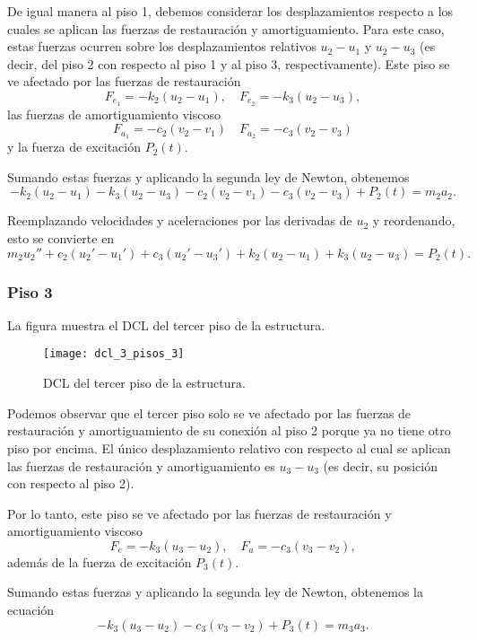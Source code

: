 De igual manera al piso 1, debemos considerar los desplazamientos respecto a los cuales se aplican las fuerzas de restauración y amortiguamiento. Para este caso, estas fuerzas ocurren sobre los desplazamientos relativos \(u_2 - u_1\) y \(u_2 - u_3\) (es decir, del piso 2 con respecto al piso 1 y al piso 3, respectivamente). Este piso se ve afectado por las fuerzas de restauración
\[
    F_{e_1} = -k_2(u_2 - u_1), \quad F_{e_2} = -k_3(u_2 - u_3)
,\]
las fuerzas de amortiguamiento viscoso
\[
    F_{a_1} = -c_2(v_2 - v_1) \quad F_{a_2} = -c_3(v_2 - v_3)
\]
y la fuerza de excitación \(P_2(t)\).

Sumando estas fuerzas y aplicando la segunda ley de Newton, obtenemos
\[
    -k_2(u_2 - u_1) - k_3(u_2 - u_3) - c_2(v_2 - v_1) - c_3(v_2 - v_3) + P_2(t) = m_2 a_2
.\]

Reemplazando velocidades y aceleraciones por las derivadas de \(u_2\) y reordenando, esto se convierte en
\begin{equation}\label{eqn:floor-2}
    m_2 u_2'' + c_2(u_2' - u_1') + c_3(u_2' - u_3') + k_2(u_2 - u_1) + k_3(u_2 - u_3) = P_2(t)
.\end{equation}


\subsubsection*{Piso 3}

La figura  muestra el DCL del tercer piso de la estructura.

\begin{figure}[h]
    \centering
    \texttt{[image: dcl\_3\_pisos\_3]}
    \caption{DCL del tercer piso de la estructura.}
    \label{fig:3-floor-dcl-3}
\end{figure}


Podemos observar que el tercer piso solo se ve afectado por las fuerzas de restauración y amortiguamiento de su conexión al piso 2 porque ya no tiene otro piso por encima. El único desplazamiento relativo con respecto al cual se aplican las fuerzas de restauración y amortiguamiento es \(u_3 - u_3\) (es decir, su posición con respecto al piso 2).

Por lo tanto, este piso se ve afectado por las fuerzas de restauración y amortiguamiento viscoso
\[
    F_e = -k_3(u_3 - u_2), \quad F_a = -c_3(v_3 - v_2)
,\]
además de la fuerza de excitación \(P_3(t)\).

Sumando estas fuerzas y aplicando la segunda ley de Newton, obtenemos la ecuación
\[
    -k_3(u_3 - u_2) - c_3(v_3 - v_2) + P_3(t) = m_3 a_3
.\]

